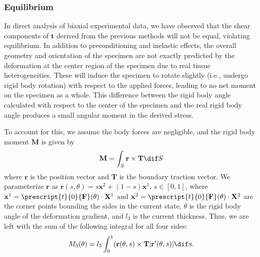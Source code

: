     


\subsubsection{Equilibrium}

    In direct analysis of biaxial experimental data, we have observed that the shear components of $\mathbf{t}$ derived from the previous methods \cite{freed_hypoelastic_2010} will not be equal, violating equilibrium. In addition to preconditioning and inelastic effects, the overall geometry and orientation of the specimen are not exactly predicted by the deformation at the center region of the specimen due to real tissue heterogeneities. These will induce the specimen to rotate slightly (i.e., undergo rigid body rotation) with respect to the applied forces, leading to no net moment on the specimen as a whole. This difference between the rigid body angle calculated with respect to the center of the specimen and the real rigid body angle produces a small angular moment in the derived stress.
    
    
    To account for this, we assume the body forces are negligible, and the rigid body moment $\mathbf{M}$ is given by
        \begin{equation}\label{A:eqn:4}
        \begin{aligned}
        \mathbf{M} = \int_S \mathbf{r}\times\mathbf{T}\dif S
        \end{aligned}
        \end{equation}
    where $\mathbf{r}$ is the position vector and $\mathbf{T}$ is the boundary traction vector. We parameterize $\mathbf{r}$ as $\mathbf{r}(s,\theta) = s \mathbf{x}^2 + (1-s)\mathbf{x}^1, \, s\in[0,1]$, where $\mathbf{x}^1 = \prescript{t}{0}{\mathbf{F}}(\theta)\cdot\mathbf{X}^1$ and $\mathbf{x}^2 = \prescript{t}{0}{\mathbf{F}}(\theta)\cdot\mathbf{X}^2$ are the corner points bounding the sides in the current state, $\theta$ is the rigid body angle of the deformation gradient, and $l_3$ is the current thickness. Thus, we are left with the sum of the following integral for all four sides:
        \begin{equation}\label{A:eqn:5}
        \begin{aligned}
        M_3(\theta) = l_3 \int_0^1(\mathbf{r}(\theta,s)\times\mathbf{T}|\mathbf{r}'(\theta,s)|\dif s.
        \end{aligned}
        \end{equation}
    
